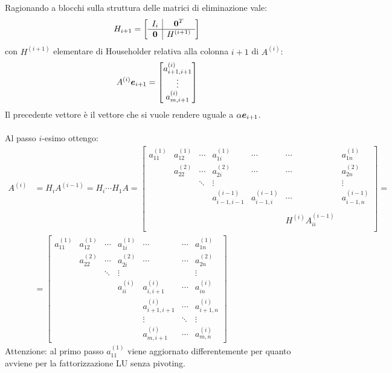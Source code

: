 \begin{oss}
Ragionando a blocchi sulla struttura delle matrici di eliminazione vale:
\begin{displaymath}
H_{i+1} = \left [ \begin{array}{c|c}
I_{i} 		& 	\boldsymbol{0}^{T} \\
\hline
\boldsymbol{0}	&	H^{(i+1)}
\end{array} \right ]
\end{displaymath}
con $H^{(i+1)}$ elementare di Householder relativa alla colonna $i+1$ di
$A^{(i)}$:
\begin{displaymath}
A^{(i)}\boldsymbol{e}_{i+1} = \begin{bmatrix}
a_{i+1, i+1}^{(i)} \\
\vdots \\
a_{m, i+1}^{(i)}
\end{bmatrix}
\end{displaymath}
Il precedente vettore \`e il vettore che si vuole rendere uguale a
$\alpha\boldsymbol{e}_{i+1}$.
\\\\
Al passo $i$-esimo ottengo:
\begin{displaymath}
\begin{split}
A^{(i)} &= H_{i}A^{(i-1)} = H_{i} \cdots H_{1}A  =
\begin{bmatrix}
a_{11}^{(1)} & a_{12}^{(1)} & \cdots & a_{1i}^{(1)}	& \cdots & \cdots &
a_{1n}^{(1)} \\ 
	& a_{22}^{(2)} & \cdots	& a_{2i}^{(2)} & \cdots & \cdots & a_{2n}^{(2)} \\
	&	&	\ddots	& \vdots &	&	& \vdots \\
	&	&	& a_{i-1,i-1}^{(i-1)}	& a_{i-1,i}^{(i-1)} & \cdots & a_{i-1,n}^{(i-1)}  \\
	&	&	& 	&  \\
 	& 	&	&	&  & H^{(i)}A_{ii}^{(i-1)} &  \\
	& 	&	&	& 	&		&  
\end{bmatrix} = \\ 
& = \begin{bmatrix}
a_{11}^{(1)} & a_{12}^{(1)} & \cdots & a_{1i}^{(1)}	& \cdots & \cdots &
a_{1n}^{(1)} \\ 
	& a_{22}^{(2)} & \cdots	& a_{2i}^{(2)} & \cdots & \cdots & a_{2n}^{(2)} \\
	&	&	\ddots	& \vdots &	&	& \vdots \\
	&	&	& a_{ii}^{(i)}	& a_{i,i+1}^{(i)} & \cdots & a_{in}^{(i)}  \\
	&	&	& 	& a_{i+1,i+1}^{(i)} & \cdots & a_{i+1,n}^{(i)}  \\
 	& 	&	&	& \vdots & \ddots & \vdots \\
	& 	&	&	& a_{m, i+1}^{(i)}	&	\cdots	& a_{m, n}^{(i)} 
\end{bmatrix}
\end{split}
\end{displaymath}
Attenzione: al primo passo $a_{11}^{(1)}$ viene aggiornato differentemente per
quanto avviene per la fattorizzazione LU senza pivoting.
\end{oss}

